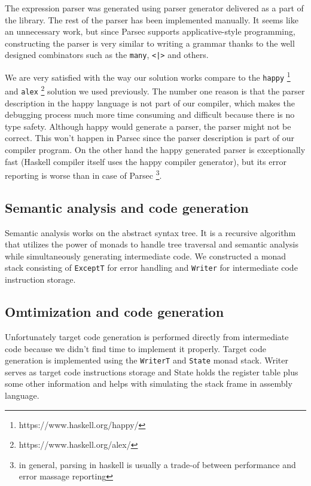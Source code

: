 \documentclass[titlepage]{article}
\begin{document}
The expression parser was generated using parser generator delivered as a part of the
library. The rest of the parser has been implemented manually. It seems like an 
unnecessary work, but since Parsec supports applicative-style programming, 
constructing the parser is very similar to writing a grammar thanks to the well 
designed combinators such as the \texttt{many}, \texttt{<|>} and others.

We are very satisfied with the way our solution works compare to the \texttt{happy}
\footnote{https://www.haskell.org/happy/} and \texttt{alex} 
\footnote{https://www.haskell.org/alex/} solution we used previously. The number one
reason is that the parser description in the happy language is not part of our 
compiler, which makes the debugging process much more time consuming and difficult
because there is no type safety. Although happy would generate a parser, the parser
might not be correct. This won't happen in Parsec since the parser description is 
part of our compiler program.
On the other hand the happy generated parser is exceptionally fast (Haskell compiler 
itself uses the happy compiler generator), but its error reporting is worse than in
case of Parsec \footnote{in general, parsing in haskell is usually a trade-of between performance
and error massage reporting}.

\subsection{Semantic analysis and code generation}
Semantic analysis works on the abstract syntax tree. It is a recursive algorithm that
utilizes the power of monads to handle tree traversal and semantic analysis while
simultaneously generating intermediate code. We constructed a monad stack consisting of
\texttt{ExceptT} for error handling and \texttt{Writer} for intermediate code instruction
storage. 

\subsection{Omtimization and code generation}
Unfortunately target code generation is performed directly from intermediate code because
we didn't find time to implement it properly. Target code generation is implemented 
using the \texttt{WriterT} and \texttt{State} monad stack. Writer serves as target code 
instructions storage and State holds the register table plus some other information and 
helps with simulating the stack frame in assembly language. 
\end{document}
